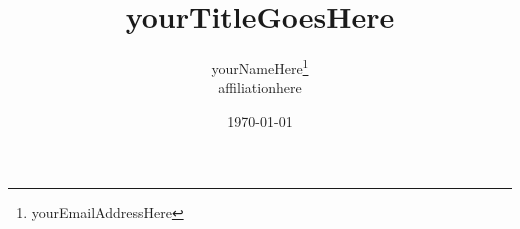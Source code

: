 \documentclass[11pt, letterpaper, twoside]{article}
\author{
    yourNameHere\thanks{
        yourEmailAddressHere
    } \\
    affiliationhere
}
\date{
    \today
}
\begin{document}
\title{\large\textbf{
    yourTitleGoesHere
}}

\begin{abstract}

\end{abstract}





\end{document}
